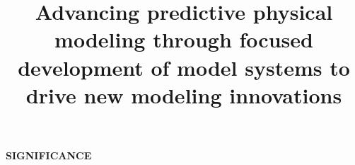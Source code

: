 \documentclass[11pt]{article}
\title{ Advancing predictive physical modeling through focused development of model systems to drive new modeling innovations}
\begin{document}







{\large \bf SIGNIFICANCE}

\end{document}
